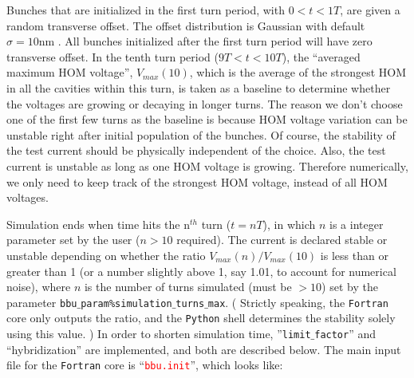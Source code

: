 \documentclass{article}
\begin{document}
Bunches that are initialized in the first turn period, with $0 < t <1T$, are given a random transverse offset. The offset distribution is Gaussian with default $\sigma = 10 \text{nm}$ . All bunches initialized after the first turn period will have zero transverse offset. In the tenth turn period ($9T < t < 10T$), the ``averaged maximum HOM voltage'', $V_{max}(10)$, which is the average of the strongest HOM in all the cavities within this turn, is taken as a baseline to determine whether the voltages are growing or decaying in longer turns. The reason we don't choose one of the first few turns as the baseline is because HOM voltage variation can be unstable right after initial population of the bunches. Of course, the stability of the test current should be physically independent of the choice. Also, the test current is unstable as long as one HOM voltage is growing. Therefore numerically, we only need to keep track of the strongest HOM voltage, instead of all HOM voltages.

Simulation ends when time hits the n$^{th}$ turn ($t = nT$), in which $n$ is a integer parameter set by the user ($n>10$ required). The current is declared stable or unstable depending on whether the ratio $V_{max}(n)/V_{max}(10)$ is less than or greater than 1 (or a number slightly above 1, say 1.01, to account for numerical noise), where $n$ is the number of
turns simulated (must be $>10$) set by the parameter \texttt{bbu$\_$param\%simulation$\_$turns$\_$max}. ( Strictly speaking, the \texttt{Fortran} core only outputs the ratio, and the \texttt{Python} shell determines the stability solely using this value. ) In order to shorten simulation time, ''\texttt{limit$\_$factor}'' and ``hybridization'' are implemented, and both are described below.
\bigbreak
The main input file for the \texttt{Fortran} core is ``\textcolor{red}{\texttt{bbu.init}}'', which looks like:
\end{document}
